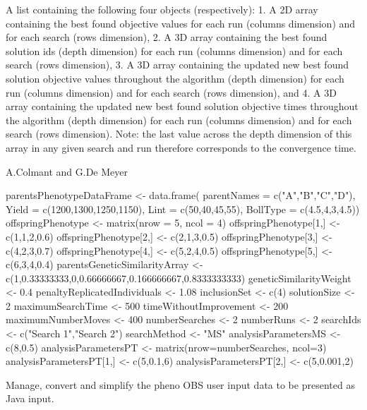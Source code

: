 \documentclass[a4paper]{book}
\begin{document}
%
\begin{Value}
A list containing the following four objects (respectively): 
1. A 2D array containing the best found objective values for each run (columns dimension) and for each search (rows dimension),
2. A 3D array containing the best found solution ids (depth dimension) for each run (columns dimension) and for each search (rows dimension),
3. A 3D array containing the updated new best found solution objective values throughout the algorithm (depth dimension) for each run (columns dimension) and for each search (rows dimension), and
4. A 3D array containing the updated new best found solution objective times throughout the algorithm (depth dimension) for each run (columns dimension) and for each search (rows dimension).
Note: the last value across the depth dimension of this array in any given search and run therefore corresponds to the convergence time.
\end{Value}
%
\begin{Author}\relax
A.Colmant and G.De Meyer
\end{Author}
%
\begin{Examples}
\begin{ExampleCode}
parentsPhenotypeDataFrame <- data.frame(
parentNames = c("A","B","C","D"),
Yield = c(1200,1300,1250,1150),
Lint = c(50,40,45,55),
BollType = c(4.5,4,3,4.5))
offspringPhenotype <- matrix(nrow = 5, ncol = 4)
offspringPhenotype[1,] <- c(1,1,2,0.6)
offspringPhenotype[2,] <- c(2,1,3,0.5)
offspringPhenotype[3,] <- c(4,2,3,0.7)
offspringPhenotype[4,] <- c(5,2,4,0.5)
offspringPhenotype[5,] <- c(6,3,4,0.4)
parentsGeneticSimilarityArray <- c(1,0.33333333,0,0.66666667,0.166666667,0.8333333333)
geneticSimilarityWeight <- 0.4
penaltyReplicatedIndividuals <- 1.08
inclusionSet <- c(4)
solutionSize <- 2
maximumSearchTime <- 500
timeWithoutImprovement <- 200
maximumNumberMoves <- 400
numberSearches <- 2
numberRuns <- 2
searchIds <- c("Search 1","Search 2")
searchMethod <- "MS"
analysisParametersMS <- c(8,0.5) 
analysisParametersPT <- matrix(nrow=numberSearches, ncol=3)
analysisParametersPT[1,] <- c(5,0.1,6)
analysisParametersPT[2,] <- c(5,0.001,2)

\end{ExampleCode}
\end{Examples}
%
\begin{Description}\relax
Manage, convert and simplify the pheno OBS user input data to be presented as Java input.
\end{Description}
\end{document}
